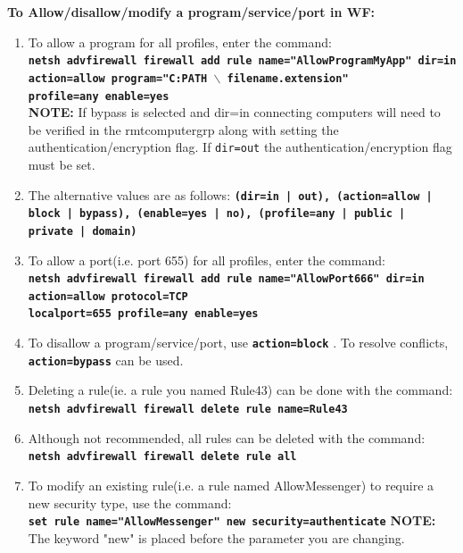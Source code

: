 \documentclass[12pt]{extarticle}
\begin{document}
\item \textbf{To Allow/disallow/modify a program/service/port in WF:\cite{NetshADV2012Microsoft}}

\begin{enumerate}

\item To allow a program for all profiles, enter the command:\\
\textbf{\texttt{netsh advfirewall firewall add rule name="AllowProgramMyApp" dir=in action=allow program="C:PATH $\backslash$ filename.extension" \\profile=any enable=yes\\}}
{\textbf{NOTE: } } If bypass is selected and dir=in connecting computers will need to be verified in the rmtcomputergrp along with setting the authentication/encryption flag. If \texttt{dir=out} the authentication/encryption flag must be set.\\


\item The alternative values are as follows: \textbf{\texttt{(dir=in | out), (action=allow | block | bypass), (enable=yes | no), (profile=any | public | \\private | domain)} }

\item To allow a port(i.e. port 655) for all profiles, enter the command:\\
\textbf{\texttt{netsh advfirewall firewall add rule name="AllowPort666" dir=in action=allow protocol=TCP \\ localport=655 profile=any enable=yes} }

\item To disallow a program/service/port, use \textbf{ \texttt{action=block} }. To resolve conflicts, \textbf{\texttt{ action=bypass} } can be used.

\item Deleting a rule(ie. a rule you named Rule43) can be done with the command:\\
\textbf{\texttt{netsh advfirewall firewall delete rule name=Rule43} }
\item Although not recommended, all rules can be deleted with the command:\\
\textbf{\texttt{netsh advfirewall firewall delete rule all} }

\item To modify an existing rule(i.e. a rule named AllowMessenger) to require a new security type, use the command:\\
\textbf{\texttt{set rule name="AllowMessenger" new security=authenticate} }
\textbf{NOTE:} The keyword "new" is placed before the parameter you are changing.


\end{enumerate}
\end{document}
